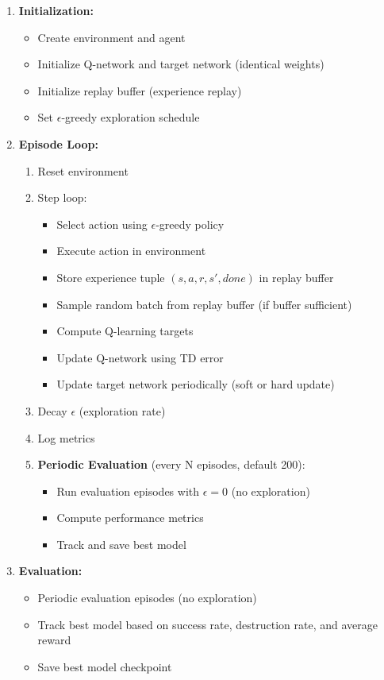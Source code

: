 \begin{enumerate}
    \item \textbf{Initialization:}
    \begin{itemize}
        \item Create environment and agent
        \item Initialize Q-network and target network (identical weights)
        \item Initialize replay buffer (experience replay)
        \item Set $\epsilon$-greedy exploration schedule
    \end{itemize}
    \item \textbf{Episode Loop:}
    \begin{enumerate}
        \item Reset environment
        \item Step loop:
        \begin{itemize}
            \item Select action using $\epsilon$-greedy policy
            \item Execute action in environment
            \item Store experience tuple $(s, a, r, s', done)$ in replay buffer
            \item Sample random batch from replay buffer (if buffer sufficient)
            \item Compute Q-learning targets
            \item Update Q-network using TD error
            \item Update target network periodically (soft or hard update)
        \end{itemize}
        \item Decay $\epsilon$ (exploration rate)
        \item Log metrics
        \item \textbf{Periodic Evaluation} (every N episodes, default 200):
        \begin{itemize}
            \item Run evaluation episodes with $\epsilon = 0$ (no exploration)
            \item Compute performance metrics
            \item Track and save best model
        \end{itemize}
    \end{enumerate}
    \item \textbf{Evaluation:}
    \begin{itemize}
        \item Periodic evaluation episodes (no exploration)
        \item Track best model based on success rate, destruction rate, and average reward
        \item Save best model checkpoint
    \end{itemize}
\end{enumerate}

